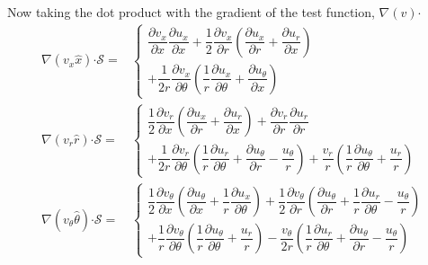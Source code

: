 \documentclass{kthreport}
\newcommand{\bigcdot}{\bm{\cdot}}
\begin{document}
Now taking the dot product with the gradient of the test function, $\nabla (v)\bigcdot$
\begin{subequations}
\begin{eqnarray}
	\nabla(v_{x}\hat{x})\bigcdot\mathcal{S} = & \left\{
	\begin{split}
	\dfrac{\partial v_{x}}{\partial x}\dfrac{\partial u_{x}}{\partial x} 
	+ \dfrac{1}{2}\dfrac{\partial v_{x}}{\partial r}\left(\dfrac{\partial u_{x}}{\partial r} + \dfrac{\partial u_{r}}{\partial x}	\right) \\
	+ \dfrac{1}{2r}\dfrac{\partial v_{x}}{\partial \theta}\left(\dfrac{1}{r}\dfrac{\partial u_{x}}{\partial \theta} + \dfrac{\partial u_{\theta}}{\partial x} \right) 
		\end{split} \right. \\
	\nabla(v_{r}\hat{r})\bigcdot\mathcal{S} = & \left\{
	\begin{split}
	\dfrac{1}{2}\dfrac{\partial v_{r}}{\partial x}\left(\dfrac{\partial u_{x}}{\partial r} + \dfrac{\partial u_{r}}{\partial x} \right)
	+ \dfrac{\partial v_{r}}{\partial r}\dfrac{\partial u_{r}}{\partial r} \\
	+ \dfrac{1}{2r}\dfrac{\partial v_{r}}{\partial \theta}\left(\dfrac{1}{r}\dfrac{\partial u_{r}}{\partial \theta} + \dfrac{\partial u_{\theta}}{\partial r} - \dfrac{u_{\theta}}{r} \right) 
	+ \dfrac{v_{r}}{r}\left(\dfrac{1}{r}\dfrac{\partial u_{\theta}}{\partial \theta} + \dfrac{u_{r}}{r}	\right)
		\end{split}\right. \\
	\nabla(v_{\theta}\hat{\theta})\bigcdot\mathcal{S} =&  \left\{
	\begin{split}
	\dfrac{1}{2}\dfrac{\partial v_{\theta}}{\partial x}\left(\dfrac{\partial u_{\theta}}{\partial x} + \dfrac{1}{r}\dfrac{\partial u_{x}}{\partial \theta} \right) 
	+ \dfrac{1}{2}\dfrac{\partial v_{\theta}}{\partial r}\left(\dfrac{\partial u_{\theta}}{\partial r} + \dfrac{1}{r}\dfrac{\partial u_{r}}{\partial \theta} - \dfrac{u_{\theta}}{r}	\right) \\
	+ \dfrac{1}{r}\dfrac{\partial v_{\theta}}{\partial \theta}\left(\dfrac{1}{r}\dfrac{\partial u_{\theta}}{\partial \theta} + \dfrac{u_{r}}{r}	\right)
	- \dfrac{v_{\theta}}{2r} \left(\dfrac{1}{r}\dfrac{\partial u_{r}}{\partial \theta} + \dfrac{\partial u_{\theta}}{\partial r} - \dfrac{u_{\theta}}{r} \right) 
	\end{split}\right.
\end{eqnarray}
\end{subequations}
\end{document}
